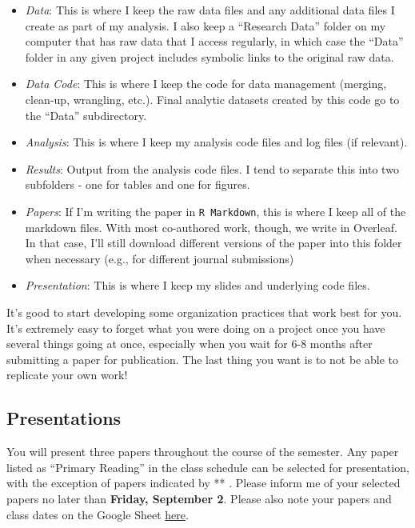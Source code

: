 \documentclass[11pt,]{article}
\begin{document}
\begin{itemize}
\item
  \emph{Data}: This is where I keep the raw data files and any
  additional data files I create as part of my analysis. I also keep a
  ``Research Data'' folder on my computer that has raw data that I
  access regularly, in which case the ``Data'' folder in any given
  project includes symbolic links to the original raw data.
\item
  \emph{Data Code}: This is where I keep the code for data management
  (merging, clean-up, wrangling, etc.). Final analytic datasets created
  by this code go to the ``Data'' subdirectory.
\item
  \emph{Analysis}: This is where I keep my analysis code files and log
  files (if relevant).
\item
  \emph{Results}: Output from the analysis code files. I tend to
  separate this into two subfolders - one for tables and one for
  figures.
\item
  \emph{Papers}: If I'm writing the paper in \texttt{R\ Markdown}, this
  is where I keep all of the markdown files. With most co-authored work,
  though, we write in Overleaf. In that case, I'll still download
  different versions of the paper into this folder when necessary (e.g.,
  for different journal submissions)
\item
  \emph{Presentation}: This is where I keep my slides and underlying
  code files.
\end{itemize}

It's good to start developing some organization practices that work best
for you. It's extremely easy to forget what you were doing on a project
once you have several things going at once, especially when you wait for
6-8 months after submitting a paper for publication. The last thing you
want is to not be able to replicate your own work!

\hypertarget{presentations}{%
\subsection{Presentations}\label{presentations}}

You will present three papers throughout the course of the semester. Any
paper listed as ``Primary Reading'' in the class schedule can be
selected for presentation, with the exception of papers indicated by **
. Please inform me of your selected papers no later than \textbf{Friday,
September 2}. Please also note your papers and class dates on the Google
Sheet
\href{https://docs.google.com/spreadsheets/d/1d6IVg-khbreLKobiczNwEOT9gjPNNykrFEtc2rXdJ4I/edit?usp=sharing}{here}.
\end{document}

